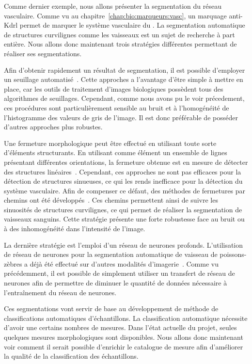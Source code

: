 \documentclass[\main/main.tex]{subfiles}
\begin{document}
%
Comme dernier exemple, nous allons présenter la segmentation du réseau vasculaire.
%
Comme vu au chapitre~\ref{chap:bio:marqueurs:vasc}, un marquage anti-Kdrl permet de marquer le système vasculaire du \pz{}.
%
La segmentation automatique de structures curvilignes comme les vaisseaux est un sujet de recherche à part entière.
%
Nous allons donc maintenant trois stratégies différentes permettant de réaliser ses segmentations.

%
Afin d'obtenir rapidement un résultat de segmentation, il est possible d'employer un seuillage automatisé~\cite{kugler_2019}.
%
Cette approches a l'avantage d'être simple à mettre en place, car les outils de traitement d'images biologiques possèdent tous des algorithmes de seuillages.
%
Cependant, comme nous avons pu le voir précedement, ces procédures sont particulièrement sensible au bruit et à l'homogénéité de l'histogramme des valeurs de gris de l'image.
%
Il est donc préférable de posséder d'autres approches plus robustes.

%
Une fermeture morphologique peut être effectué en utilisant toute sorte d'éléments structurants.
%
En utilisant comme élément un ensemble de lignes présentant différentes orientations, 
la fermeture obtenue est en mesure de détecter des structures linéaires~\cite{Soille_2001}.
%
Cependant, ces approches ne sont pas efficaces pour la détection de structures sinueuses, ce qui les rends inefficace pour la détection du système vasculaire.
%
Afin de compenser ce défaut, des méthodes de fermetures par chemins ont été développés~\cite{talbot_2007,merveille_2018}.
%
Ces chemins permettent ainsi de suivre les sinuosités de structures curvilignes, ce qui permet de réaliser la segmentation de vaisseaux sanguins.
%
Cette stratégie présente une forte robustesse face au bruit ou à des inhomogénéité dans l'intensité de l'image.

%
La dernière stratégie est l'emploi d'un réseau de neurones profonds.
%
L'utilisation de réseau de neurones pour la segmentation automatique de vaisseau de poissons-zèbres a déjà été effectué sur d'autres modalités d'imagerie~\cite{zhang_2019a, deaetwyler_2019}.
%
Comme vu précédemment, il est possible de simplement utiliser un transfert de réseau de neurones afin de permettre de diminuer le quantité de données nécessaire à l'entraînement du réseau de neurones.

%
Ces segmentations vont servir de base au développement de méthode de classifications automatiques d'échantillons.
%
La classification automatique nécessite d'avoir une certains nombres de mesures.
%
Dans l'état actuelle du projet, seules quelques mesures morphologiques sont disponibles.
%
Nous allons donc maintenant voir comment il serait possible d'enrichir le catalogue de mesure afin d'améliorer la qualité de la classification des échantillons.
\end{document}
